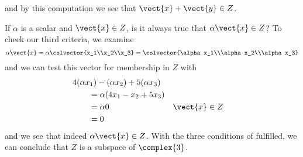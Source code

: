 %
and by this computation we see that $\vect{x}+\vect{y}\in Z$.\par
%
If $\alpha$ is a scalar and $\vect{x}\in Z$, is it always true that $\alpha\vect{x}\in Z$?    To check our third criteria, we examine
%
\begin{equation*}
\alpha\vect{x}=\alpha\colvector{x_1\\x_2\\x_3}=\colvector{\alpha x_1\\\alpha x_2\\\alpha x_3}
\end{equation*}
%
and we can test this vector for membership in $Z$ with 
%
\begin{align*}
&4(\alpha x_1)-(\alpha x_2)+5(\alpha x_3)\\
&\quad\quad=\alpha(4x_1-x_2+5x_3)\\
&\quad\quad=\alpha 0&&\vect{x}\in Z\\
&\quad\quad=0
\end{align*}
%
and we see that indeed $\alpha\vect{x}\in Z$.  With the three conditions of  fulfilled, we can conclude that $Z$ is a subspace of $\complex{3}$.
